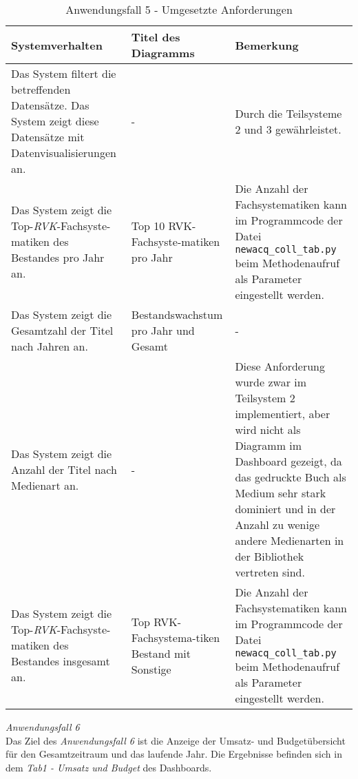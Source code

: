 \begingroup
    \setlength{\tabcolsep}{12pt} %
    \renewcommand{\arraystretch}{1.5} 
    \begin{table}[h]
        \centering
        \Large
        \begin{adjustbox}{max width=\textwidth}
        \begin{tabular}{p{}p{}p{}}
           \toprule
           Systemverhalten       &Titel des Diagramms &Bemerkung\\
           \midrule
           Das System filtert die betreffenden Datensätze. Das System zeigt diese Datensätze mit Datenvisualisierungen an.&-&Durch die Teilsysteme 2 und 3 gewährleistet.\\
           Das System zeigt die Top-\textit{\acrshort{RVK}}-Fachsyste-matiken des Bestandes pro Jahr an.&Top 10 RVK-Fachsyste-matiken pro Jahr&Die Anzahl der Fachsystematiken kann im Programmcode der Datei \texttt{newacq\_coll\_tab.py} beim Methodenaufruf als Parameter eingestellt werden.\\
           Das System zeigt die Gesamtzahl der Titel nach Jahren an.&Bestandswachstum pro Jahr und Gesamt&-\\
           Das System zeigt die Anzahl der Titel nach Medienart an.&-&Diese Anforderung wurde zwar im Teilsystem 2 implementiert, aber wird nicht als Diagramm im Dashboard gezeigt, da das gedruckte Buch als Medium sehr stark dominiert und in der Anzahl zu wenige andere Medienarten in der Bibliothek vertreten sind.\\
           Das System zeigt die Top-\textit{\acrshort{RVK}}-Fachsyste-matiken des Bestandes insgesamt an.&Top RVK-Fachsystema-tiken Bestand mit Sonstige&Die Anzahl der Fachsystematiken kann im Programmcode der Datei \texttt{newacq\_coll\_tab.py} beim Methodenaufruf als Parameter eingestellt werden.\\
        \bottomrule
        \end{tabular}
        \end{adjustbox}
        \caption{%
            Anwendungsfall 5 - Umgesetzte Anforderungen
        }
        \label{tab:Anwendungsfall 5 - Umgesetzte Anforderungen}
        \end{table}
\endgroup

\clearpage
\noindent
\textit{Anwendungsfall 6}\\
Das Ziel des \textit{Anwendungsfall 6} ist die Anzeige der Umsatz- und Budgetübersicht für den Gesamtzeitraum und das laufende Jahr.
Die Ergebnisse befinden sich in dem \textit{Tab1 - Umsatz und Budget} des Dashboards.

